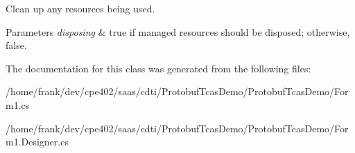 Clean up any resources being used. 


\begin{DoxyParams}{Parameters}
{\em disposing} & true if managed resources should be disposed; otherwise, false.\\
\hline
\end{DoxyParams}


The documentation for this class was generated from the following files\+:\begin{DoxyCompactItemize}
\item 
/home/frank/dev/cpe402/saas/cdti/\+Protobuf\+Tcas\+Demo/\+Protobuf\+Tcas\+Demo/Form1.\+cs\item 
/home/frank/dev/cpe402/saas/cdti/\+Protobuf\+Tcas\+Demo/\+Protobuf\+Tcas\+Demo/Form1.\+Designer.\+cs\end{DoxyCompactItemize}
